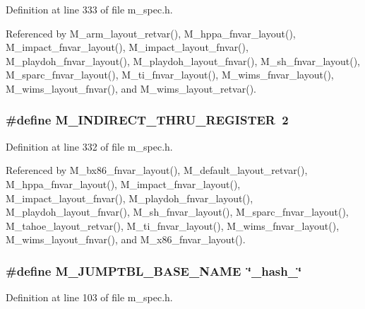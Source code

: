 Definition at line 333 of file m\_\-spec.h.

Referenced by M\_\-arm\_\-layout\_\-retvar(), M\_\-hppa\_\-fnvar\_\-layout(), M\_\-impact\_\-fnvar\_\-layout(), M\_\-impact\_\-layout\_\-fnvar(), M\_\-playdoh\_\-fnvar\_\-layout(), M\_\-playdoh\_\-layout\_\-fnvar(), M\_\-sh\_\-fnvar\_\-layout(), M\_\-sparc\_\-fnvar\_\-layout(), M\_\-ti\_\-fnvar\_\-layout(), M\_\-wims\_\-fnvar\_\-layout(), M\_\-wims\_\-layout\_\-fnvar(), and M\_\-wims\_\-layout\_\-retvar().
\subsubsection{\setlength{\rightskip}{0pt plus 5cm}\#define M\_\-INDIRECT\_\-THRU\_\-REGISTER~2}\label{m__spec_8h_0b62aabc0a638bb64487da1b322ea485}




Definition at line 332 of file m\_\-spec.h.

Referenced by M\_\-bx86\_\-fnvar\_\-layout(), M\_\-default\_\-layout\_\-retvar(), M\_\-hppa\_\-fnvar\_\-layout(), M\_\-impact\_\-fnvar\_\-layout(), M\_\-impact\_\-layout\_\-fnvar(), M\_\-playdoh\_\-fnvar\_\-layout(), M\_\-playdoh\_\-layout\_\-fnvar(), M\_\-sh\_\-fnvar\_\-layout(), M\_\-sparc\_\-fnvar\_\-layout(), M\_\-tahoe\_\-layout\_\-retvar(), M\_\-ti\_\-fnvar\_\-layout(), M\_\-wims\_\-fnvar\_\-layout(), M\_\-wims\_\-layout\_\-fnvar(), and M\_\-x86\_\-fnvar\_\-layout().
\subsubsection{\setlength{\rightskip}{0pt plus 5cm}\#define M\_\-JUMPTBL\_\-BASE\_\-NAME~\char`\"{}\_\-hash\_\-\char`\"{}}\label{m__spec_8h_91738d188178cb7ffde04007c9923df5}




Definition at line 103 of file m\_\-spec.h.

